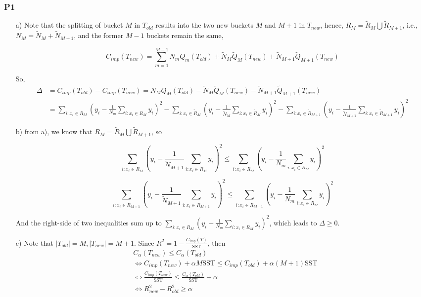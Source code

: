 \documentclass{article}
\begin{document}
\subsubsection*{P1}
\begin{itemize}
\item[a)] Note that the splitting of bucket $M$ in $T_{old}$ results into the two new buckets $M$ and $M+1$ in $T_{new}$, hence, $R_M=\tilde{R}_M \bigcup \tilde{R}_{M+1}$, i.e., $N_M = \tilde{N}_M + \tilde{N}_{M+1} $, and the former $M-1$ buckets remain the same,

$$C_{imp}(T_{new}) = \sum_{m=1}^{M-1} N_m Q_m(T_{old}) + \tilde{N}_M \tilde{Q}_M(T_{new}) + \tilde{N}_{M+1} \tilde{Q}_{M+1}(T_{new})$$

So, 
\begin{equation*}
\begin{split}
\Delta &= C_{imp}(T_{old}) - C_{imp}(T_{new}) = N_M Q_M(T_{old}) -  \tilde{N}_M \tilde{Q}_M(T_{new}) - \tilde{N}_{M+1} \tilde{Q}_{M+1}(T_{new}) \\
&= \sum_{i:x_i\in R_M} \left(y_i - \frac{1}{N_m} \sum_{i:x_i\in R_M} y_i \right)^2 - \sum_{i:x_i\in \tilde{R}_M} \left(y_i - \frac{1}{\tilde{N}_M} \sum_{i:x_i\in \tilde{R}_M} y_i \right)^2  - \sum_{i:x_i\in \tilde{R}_{M+1}} \left(y_i - \frac{1}{\tilde{N}_{M+1}} \sum_{i:x_i\in \tilde{R}_{M+1}} y_i \right)^2
\end{split}
\end{equation*}
\item[b)] from a), we know that $R_M=\tilde{R}_M \bigcup \tilde{R}_{M+1}$, so

$$\sum_{i:x_i\in \tilde{R}_M} \left(y_i - \frac{1}{\tilde{N}_{M+1}} \sum_{i:x_i\in \tilde{R}_M}  y_i \right)^2 \leq \sum_{i:x_i\in \tilde{R}_M} \left(y_i - \frac{1}{N_m} \sum_{i:x_i\in R_M} y_i\right)^2$$

$$\sum_{i:x_i\in \tilde{R}_{M+1}} \left(y_i - \frac{1}{\tilde{N}_{M+1}} \sum_{i:x_i\in \tilde{R}_{M+1}}  y_i \right)^2 \leq \sum_{i:x_i\in \tilde{R}_{M+1}} \left(y_i - \frac{1}{N_m} \sum_{i:x_i\in R_M} y_i\right)^2$$


And the right-side of two inequalities sum up to $\sum_{i:x_i\in R_M} \left(y_i - \frac{1}{N_m} \sum_{i:x_i\in R_M} y_i \right)^2 $, which leads to $\Delta \geq 0$.

\item[c)] Note that $|T_{old}|=M, |T_{new}|=M+1$. Since $R^2=1-\frac{C_{imp}(T)}{\text{SST}}$, then
\begin{equation*}
\begin{split}
& C_\alpha(T_{new}) \leq C_\alpha(T_{old}) \\
&\iff  C_{imp}(T_{new}) + \alpha M\text{SST} \leq C_{imp}(T_{old}) + \alpha (M+1)\text{SST} \\
&\iff  \frac{C_{imp}(T_{new})}{\text{SST}}  \leq \frac{C_\alpha(T_{old})}{\text{SST}} + \alpha \\
&\iff R^2_{new} - R^2_{old} \geq \alpha
\end{split}
\end{equation*}

\end{itemize}
\end{document}
